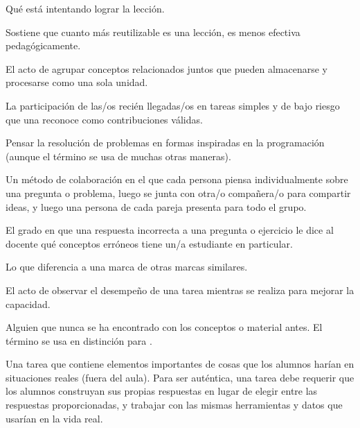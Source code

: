 \begin{description}
 Qué está intentando lograr la lección.

 Sostiene que cuanto más reutilizable es una lección, es menos efectiva pedagógicamente.

 El acto de agrupar conceptos relacionados juntos
que pueden almacenarse y procesarse como una sola unidad.

 La participación de las/os recién llegadas/os en tareas simples y de bajo riesgo que una  
 reconoce como contribuciones válidas.

 Pensar la
resolución de problemas en formas inspiradas en la programación (aunque el término se usa de muchas otras maneras).

 Un método de colaboración 
en el que cada persona piensa individualmente sobre una pregunta o problema,
luego se junta con otra/o compañera/o para compartir ideas, y luego una persona de 
cada pareja presenta para todo el grupo.

 El grado en que una respuesta incorrecta 
a una pregunta o ejercicio le dice al docente qué conceptos erróneos tiene un/a estudiante en particular.

 Lo que diferencia a una marca de otras 
marcas similares.

 El acto de observar el desempeño 
de una tarea mientras se realiza para mejorar la capacidad.

 Alguien que nunca se ha
encontrado con los conceptos o material antes. El término se usa en distinción para
.




 Una tarea que contiene elementos importantes 
de cosas que los alumnos harían en situaciones reales (fuera del aula). Para 
ser auténtica, una tarea debe requerir que los alumnos construyan sus propias respuestas
en lugar de elegir entre las respuestas proporcionadas, y trabajar con las mismas 
herramientas y datos que usarían en la vida real.



\end{description}
